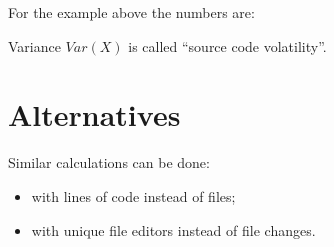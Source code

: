 \documentclass[12pt]{article}
\begin{document}
    For the example above the numbers are:

    \immediate{}
    

    Variance $Var(X)$ is called ``source code volatility''.

\section{Alternatives}

    Similar calculations can be done:

    \begin{itemize}
        \item with lines of code instead of files;
        \item with unique file editors instead of file changes.
    \end{itemize}
\end{document}
